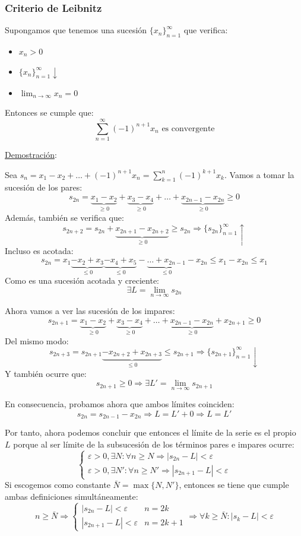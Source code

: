 \documentclass[10pt,a4paper,openright]{book}
\begin{document}
\subsubsection*{Criterio de Leibnitz}
Supongamos que tenemos una sucesión $\{x_n\}_{n=1}^\infty$ que verifica:
\begin{itemize}
\item $x_n > 0$
\item $\{x_n\}_{n=1}^\infty \downarrow$
\item $\lim_{n \rightarrow \infty} x_n = 0$
\end{itemize}
Entonces se cumple que:
$$\sum_{n=1}^{\infty} (-1)^{n+1}x_n\mbox{ es convergente}$$

\underline{Demostración}:

Sea $s_n = x_1 - x_2 + \ldots + (-1)^{n+1}x_n = \sum_{k=1}^{n} (-1)^{k+1} x_k$. Vamos a tomar la sucesión de los pares:
$$s_{2n} = \underbrace{x_1 - x_2}_{\geq 0} + \underbrace{x_3 - x_4}_{\geq 0} + \ldots + \underbrace{x_{2n-1} - x_{2n}}_{\geq 0} \geq 0$$
Además, también se verifica que:
$$s_{2n + 2} = s_{2n} + \underbrace{x_{2n + 1} - x_{2n + 2}}_{\geq 0} \geq s_{2n} \Rightarrow \{s_{2n}\}_{n=1}^\infty\uparrow$$
Incluso es acotada:
$$s_{2n} = x_1 \underbrace{-x_2 + x_3}_{\leq 0 } \underbrace{- x_4 + x_5 }_{\leq 0}- \underbrace{\ldots + x_{2n-1}}_{\leq 0} - x_{2n}\leq x_1 - x_{2n} \leq x_1 $$
Como es una sucesión acotada y creciente:
$$\exists L = \lim_{n \to \infty} s_{2n}$$

Ahora vamos a ver las sucesión de los impares:
$$s_{2n+1} =\underbrace{x_1 - x_2}_{\geq 0} + \underbrace{x_3 - x_4}_{\geq 0} + \ldots +\underbrace{x_{2n-1} - x_{2n}}_{\geq 0} + x_{2n+1} \geq 0$$
Del mismo modo:
$$s_{2n+3} = s_{2n+1} \underbrace{-x_{2n + 2} + x_{2n + 3}}_{\leq 0} \leq s_{2n+1} \Rightarrow  \{s_{2n+1}\}_{n=1}^\infty \downarrow$$
Y también ocurre que: 
$$s_{2n+1} \geq 0 \Rightarrow \exists L' = \lim_{n \to \infty} s_{2n+1}$$

En consecuencia, probamos ahora que ambos límites coinciden:
$$s_{2n} = s_{2n-1} - x_{2n} \Rightarrow L = L' + 0 \Rightarrow L = L'$$

Por tanto, ahora podemos concluir que entonces el límite de la serie es el propio $L$ porque al ser límite de la subsucesión de los términos pares e impares ocurre:
$$\begin{cases} \varepsilon > 0, \exists N : \forall n \geq N \Rightarrow |s_{2n} - L|<\varepsilon \\ \varepsilon > 0, \exists N' : \forall n \geq N' \Rightarrow |s_{2n+1} - L|<\varepsilon\end{cases} $$
Si escogemos como constante $\bar{N} = \max\{N, N'\}$, entonces se tiene que cumple ambas definiciones simultáneamente:
$$n \geq \bar{N} \Rightarrow \begin{cases} |s_{2n} - L|<\varepsilon & n = 2k \\ |s_{2n+1} - L|<\varepsilon & n = 2k+1\end{cases} \Rightarrow \forall k \geq \bar{N}: |s_k-L|<\varepsilon$$
\end{document}
